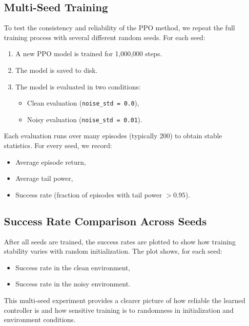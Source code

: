 \documentclass[11pt,a4paper]{article}
\begin{document}
\subsection{Multi-Seed Training}

To test the consistency and reliability of the PPO method, we repeat the full training process with several different random seeds.  
For each seed:

\begin{enumerate}
    \item A new PPO model is trained for 1,000,000 steps.
    \item The model is saved to disk.
    \item The model is evaluated in two conditions:
    \begin{itemize}
        \item Clean evaluation (\texttt{noise\_std = 0.0}),
        \item Noisy evaluation (\texttt{noise\_std = 0.01}).
    \end{itemize}
\end{enumerate}

Each evaluation runs over many episodes (typically 200) to obtain stable statistics.  
For every seed, we record:

\begin{itemize}
    \item Average episode return,
    \item Average tail power,
    \item Success rate (fraction of episodes with tail power $> 0.95$).
\end{itemize}

\subsection{Success Rate Comparison Across Seeds}

After all seeds are trained, the success rates are plotted to show how training stability varies with random initialization.  
The plot shows, for each seed:

\begin{itemize}
    \item Success rate in the clean environment,
    \item Success rate in the noisy environment.
\end{itemize}

This multi-seed experiment provides a clearer picture of how reliable the learned controller is and how sensitive training is to randomness in initialization and environment conditions.
\end{document}
